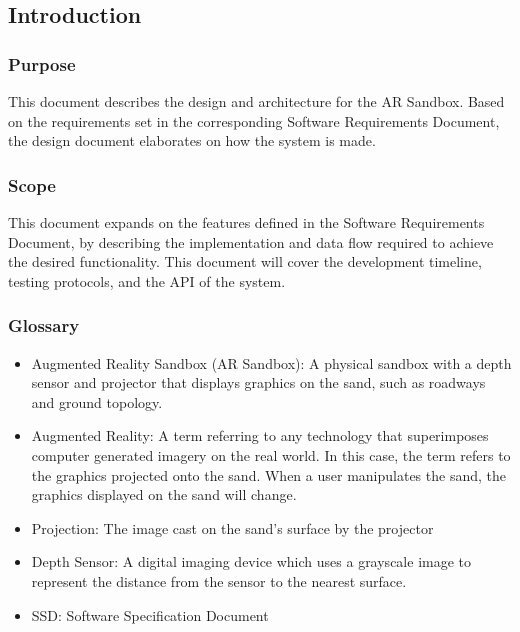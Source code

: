 
\subsection{Introduction}

\subsubsection{Purpose}
This document describes the design and architecture for the AR Sandbox. Based on the requirements set in the corresponding Software Requirements Document, the design document elaborates on how the system is made.

\subsubsection{Scope}
This document expands on the features defined in the Software Requirements Document, by describing the implementation and data flow required to achieve the desired functionality. This document will cover the development timeline, testing protocols, and the API of the system.


\subsubsection{Glossary}
\begin{itemize}
\item Augmented Reality Sandbox (AR Sandbox): A physical sandbox with a depth sensor and projector that displays graphics on the sand, such as roadways and ground topology.
\item Augmented Reality: A term referring to any technology that superimposes computer generated imagery on the real world. In this case, the term refers to the graphics projected onto the sand. When a user manipulates the sand, the graphics displayed on the sand will change.
\item Projection: The image cast on the sand's surface by the projector
\item Depth Sensor: A digital imaging device which uses a grayscale image to represent the distance from the sensor to the nearest surface.
\item SSD: Software Specification Document
\end{itemize}

